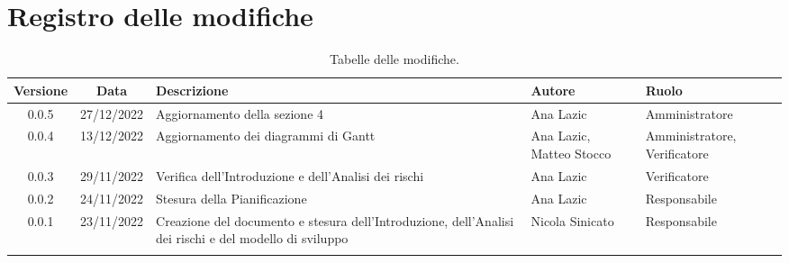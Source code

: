 \section*{Registro delle modifiche}
\begin{table}[H]
	\centering
	\renewcommand\tabularxcolumn[1]{>{\Centering}m{#1}}
	\begin{tabularx}{\textwidth}{| c | c | X | X | X |} 
	\hline
	\textbf{Versione} & \textbf{Data} & \textbf{Descrizione} & \textbf{Autore} & \textbf{Ruolo}\\
    \hline
	0.0.5 & 27/12/2022 & Aggiornamento della sezione 4 & Ana Lazic & Amministratore\\
	\hline
	0.0.4 & 13/12/2022 & Aggiornamento dei diagrammi di Gantt & Ana Lazic, Matteo Stocco & Amministratore, Verificatore\\
	\hline
	0.0.3 & 29/11/2022 & Verifica dell'Introduzione e dell'Analisi dei rischi & Ana Lazic & Verificatore\\
	\hline
	0.0.2 & 24/11/2022 & Stesura della Pianificazione & Ana Lazic & Responsabile\\
	\hline
	0.0.1 & 23/11/2022 & Creazione del documento e stesura dell'Introduzione, dell'Analisi dei rischi e del modello di sviluppo & Nicola Sinicato & Responsabile\\
 	\hline
\caption{Tabelle delle modifiche.}
	\end{tabularx}
	\vspace{10pt}
	
\end{table}
